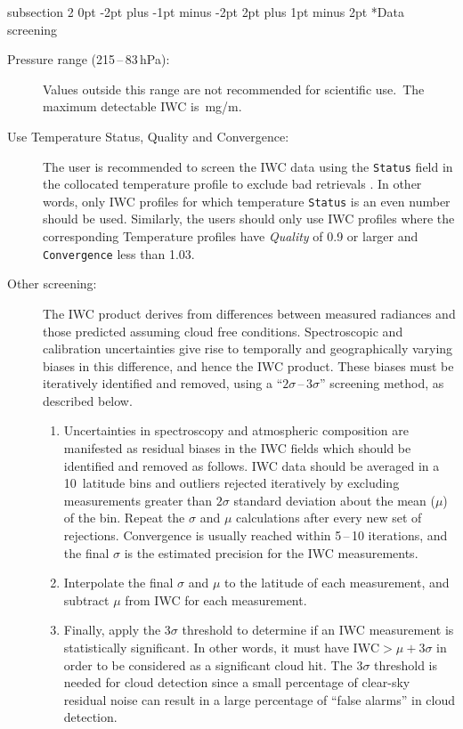 \documentclass[11pt,draft]{report}
\makeatletter
\renewcommand{\subsection}{\@startsection%
  {subsection}%
  {2}%
  {0pt}%
  {-2pt plus -1pt minus -2pt}%
  {2pt plus 1pt minus 2pt}%
  {\large\sffamily\fontseries{sb}\selectfont\flushleft\color{SectionColor}\figureversion{tabular}}}%
\newcommand{\standardrangestatement}{Values outside this range are not
  recommended for scientific use.}
\makeatother
\begin{document}
\subsection*{Data screening}
\label{sec:IWCScreening}
\begin{description}
\item[Pressure range (215\,--\,83\,hPa):] \standardrangestatement\ The
  maximum detectable IWC is \,mg/m.
\item[Use Temperature Status, Quality and Convergence:] The user is
  recommended to screen the IWC data using the \texttt{Status} field in
  the collocated temperature profile to exclude bad retrievals
  \citep{SchwartzEtal08}. In other words, only IWC profiles for which
  temperature \texttt{Status} is an even number should be used.
  Similarly, the users should only use IWC profiles where the
  corresponding Temperature profiles have \emph{Quality} of 0.9 or
  larger and \texttt{Convergence} less than 1.03.
\item[Other screening:] The IWC product derives from differences between
  measured radiances and those predicted assuming cloud free conditions.
  Spectroscopic and calibration uncertainties give rise to temporally
  and geographically varying biases in this difference, and hence the
  IWC product.  These biases must be iteratively identified and removed,
  using a ``$2\sigma$\,--\,$3\sigma$'' screening method, as described
  below.

\begin{enumerate}
\item Uncertainties in spectroscopy and atmospheric composition are
  manifested as residual biases in the IWC fields which should be
  identified and removed as follows.  IWC data should be averaged in a
  10\degsym\ latitude bins and outliers rejected iteratively by
  excluding measurements greater than $2\sigma$ standard deviation about
  the mean ($\mu$) of the bin. Repeat the $\sigma$ and $\mu$
  calculations after every new set of rejections.  Convergence is
  usually reached within 5\,--\,10 iterations, and the final $\sigma$ is
  the estimated precision for the IWC measurements.
\item Interpolate the final $\sigma$ and $\mu$ to the latitude of
  each measurement, and subtract $\mu$ from IWC for each measurement.
\item Finally, apply the 3$\sigma$ threshold to determine if an IWC
  measurement is statistically significant. In other words, it must have
  $\text{IWC} > \mu + 3\sigma$ in order to be considered as a
  significant cloud hit.  The $3\sigma$ threshold is needed for cloud
  detection since a small percentage of clear-sky residual noise can
  result in a large percentage of ``false alarms'' in cloud detection.
\end{enumerate}
\end{description}
\end{document}
